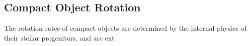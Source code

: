 {\color{orange}

\subsection{Compact Object Rotation}

The rotation rates of compact objects are determined by the internal physics of their stellar progenitors, and are ext

}